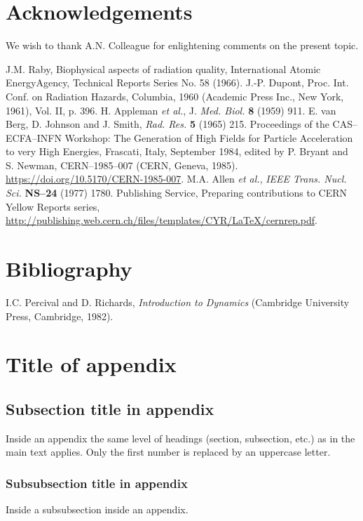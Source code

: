 \section*{Acknowledgements}

We wish to thank A.N. Colleague for enlightening comments on
the present topic.

\begin{thebibliography}{99}
J.M. Raby, Biophysical aspects of radiation quality, International 
Atomic EnergyAgency, Technical Reports Series No. 58 (1966).
J.-P. Dupont, Proc. Int. Conf. on Radiation Hazards, Columbia, 
1960 (Academic Press Inc., New York, 1961), Vol. II, p. 396.
H. Appleman \emph{et al.}, J. \emph{Med. Biol.} \textbf{8} (1959) 911.
E. van Berg, D. Johnson and J. Smith, \emph{Rad. Res.} \textbf{5} (1965) 
215.
Proceedings of the CAS--ECFA--INFN Workshop: The Generation of High Fields for Particle Acceleration to very High Energies, Frascati, Italy, September 1984, edited by P. Bryant and S. Newman, CERN--1985--007 (CERN, Geneva, 1985).\\
\url{https://doi.org/10.5170/CERN-1985-007}.
M.A. Allen \emph{et al.}, \emph{IEEE Trans. Nucl. Sci.} \textbf{NS--24} (1977) 
1780.
Publishing Service, Preparing contributions to CERN Yellow Reports series,\\
\url{http://publishing.web.cern.ch/files/templates/CYR/LaTeX/cernrep.pdf}.
\end{thebibliography}

\section*{Bibliography}


I.C. Percival and D. Richards, \emph{Introduction to Dynamics}
(Cambridge University Press, Cambridge, 1982).

\appendix
\section{Title of appendix}
\label{sec:app}

\subsection{Subsection title in appendix}

Inside an appendix the same level of headings (section, subsection,
etc.) as in the main text applies. Only the first number is replaced
by an uppercase letter.

\subsubsection{Subsubsection title in appendix}

Inside a subsubsection inside an appendix.



